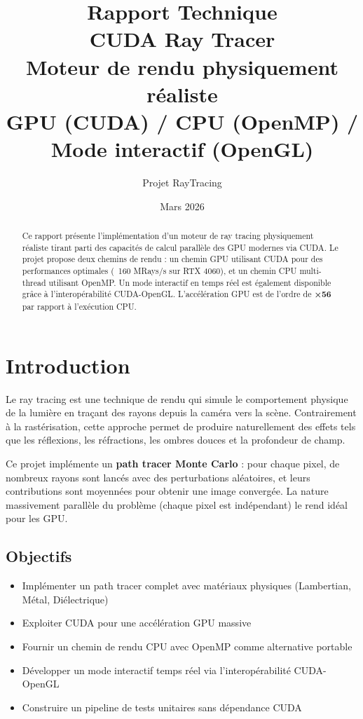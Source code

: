 \documentclass[12pt,a4paper]{article}
\title{
    \vspace{1cm}
    {\LARGE \textbf{Rapport Technique}} \\[0.5cm]
    {\Large CUDA Ray Tracer} \\[0.3cm]
    {\large Moteur de rendu physiquement réaliste} \\
    {\large GPU (CUDA) / CPU (OpenMP) / Mode interactif (OpenGL)}
    \vspace{0.5cm}
}
\author{Projet RayTracing}
\date{Mars 2026}
\begin{document}

\maketitle
\thispagestyle{empty}

\begin{abstract}
Ce rapport présente l'implémentation d'un moteur de ray tracing physiquement réaliste
tirant parti des capacités de calcul parallèle des GPU modernes via CUDA. Le projet
propose deux chemins de rendu : un chemin GPU utilisant CUDA pour des performances
optimales (~160 MRays/s sur RTX 4060), et un chemin CPU multi-thread utilisant
OpenMP. Un mode interactif en temps réel est également disponible grâce à l'interopérabilité
CUDA-OpenGL. L'accélération GPU est de l'ordre de \textbf{×56} par rapport à l'exécution CPU.
\end{abstract}

\vspace{0.5cm}
\tableofcontents
\newpage

\section{Introduction}

Le ray tracing est une technique de rendu qui simule le comportement physique de la lumière
en traçant des rayons depuis la caméra vers la scène. Contrairement à la rastérisation,
cette approche permet de produire naturellement des effets tels que les réflexions,
les réfractions, les ombres douces et la profondeur de champ.

Ce projet implémente un \textbf{path tracer Monte Carlo} : pour chaque pixel, de nombreux
rayons sont lancés avec des perturbations aléatoires, et leurs contributions sont moyennées
pour obtenir une image convergée. La nature massivement parallèle du problème
(chaque pixel est indépendant) le rend idéal pour les GPU.

\subsection{Objectifs}

\begin{itemize}
    \item Implémenter un path tracer complet avec matériaux physiques (Lambertian, Métal, Diélectrique)
    \item Exploiter CUDA pour une accélération GPU massive
    \item Fournir un chemin de rendu CPU avec OpenMP comme alternative portable
    \item Développer un mode interactif temps réel via l'interopérabilité CUDA-OpenGL
    \item Construire un pipeline de tests unitaires sans dépendance CUDA
\end{itemize}
\end{document}
